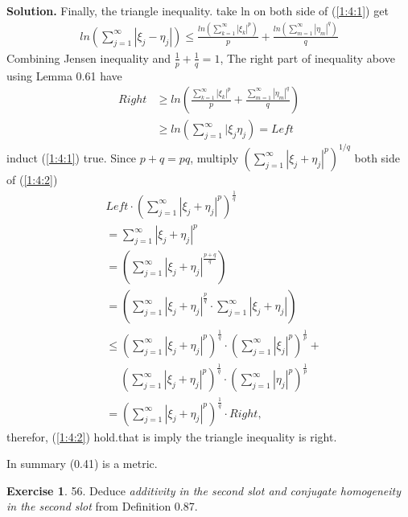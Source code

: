 \documentclass[a4paper]{book}
\newenvironment{solution}%
{\noindent\textbf{Solution.}}%
{\qedhere}
\numberwithin{equation}{chapter}
\theoremstyle{definition}
\newtheorem{exc}[exm]{Exercise}
\begin{document}
\begin{multicols}{2}
\begin{solution}
	Finally, the triangle inequality. take ln on both side of (\ref{1:4:1}) get 
	\begin{equation}
		\begin{aligned}
			ln(\sum_{j=1}^{\infty} |\xi_j - \eta_j|) \leq \frac{ln(\sum_{k=1}^{\infty}|\xi_k|^p)}{p} + \frac{ln(\sum_{m=1}^{\infty}|\eta_m|^q)}{q} 
		\end{aligned}
	\end{equation}
	Combining Jensen inequality and $ \frac{1}{p} + \frac{1}{q} = 1 $,
	The right part of inequality above using Lemma 0.61 have
	\begin{equation}
		\begin{aligned}
		Right &\geq ln(\frac{\sum_{k=1}^{\infty} |\xi_k|^p}{p} + \frac{\sum_{m=1}^{\infty} |\eta_m|^q}{q}) \\
		&\geq ln(\sum_{j=1}^{\infty}|\xi_j \eta_j) = Left
		\end{aligned}
	\end{equation} 
	induct (\ref{1:4:1}) true. Since $ p + q = pq $, multiply $ (\sum_{j=1}^{\infty}|\xi_j + \eta_j|^p)^{1/q} $ both side of (\ref{1:4:2})
	\begin{equation}
		\begin{aligned}
		&Left \cdot (\sum_{j=1}^{\infty}|\xi_j + \eta_j|^p)^{\frac{1}{q}}\\ &=\sum_{j=1}^{\infty}|\xi_j + \eta_j|^p \\
		&= (\sum_{j=1}^{\infty}|\xi_j + \eta_j|^{\frac{p+q}{q}}) \\
		&= (\sum_{j=1}^{\infty}|\xi_j + \eta_j|^{\frac{p}{q}} \cdot \sum_{j=1}^{\infty}|\xi_j + \eta_j|) \\
		&\leq (\sum_{j=1}^{\infty}|\xi_j + \eta_j|^p)^{\frac{1}{q}} \cdot (\sum_{j=1}^{\infty}|\xi_j|^p)^{\frac{1}{p}} + \\  
		& \quad \; (\sum_{j=1}^{\infty}|\xi_j + \eta_j|^p)^{\frac{1}{q}} \cdot (\sum_{j=1}^{\infty}|\eta_j|^p)^{\frac{1}{p}} \\
		&= (\sum_{j=1}^{\infty}|\xi_j + \eta_j|^p)^{\frac{1}{q}} \cdot Right,
		\end{aligned}
	\end{equation}
	therefor, (\ref{1:4:2}) hold.that is imply the triangle inequality is right.
	
	In summary (0.41) is a metric.
\end{solution}


\begin{exc}
	56. Deduce \textit{additivity in the second slot and conjugate homogeneity in the second slot} from Definition 0.87.
\end{exc}


\end{multicols}
\end{document}

